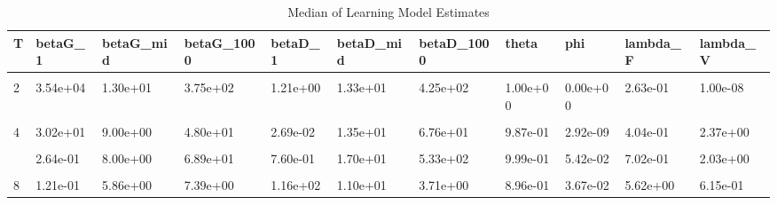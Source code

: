\begin{table}[!h]
\centering
\caption{Median of Learning Model Estimates}
\centering
\begin{tabular}[t]{lllllllllll}
\toprule
T & betaG\_1 & betaG\_mid & betaG\_1000 & betaD\_1 & betaD\_mid & betaD\_1000 & theta & phi & lambda\_F & lambda\_V\\
\midrule
\cellcolor{gray!10}{1} & \cellcolor{gray!10}{3.81e-04} & \cellcolor{gray!10}{1.58e+01} & \cellcolor{gray!10}{2.21e+02} & \cellcolor{gray!10}{7.19e-09} & \cellcolor{gray!10}{3.95e+01} & \cellcolor{gray!10}{6.58e+02} & \cellcolor{gray!10}{1.00e+00} & \cellcolor{gray!10}{8.88e-01} & \cellcolor{gray!10}{1.77e+01} & \cellcolor{gray!10}{6.18e+05}\\
2 & 3.54e+04 & 1.30e+01 & 3.75e+02 & 1.21e+00 & 1.33e+01 & 4.25e+02 & 1.00e+00 & 0.00e+00 & 2.63e-01 & 1.00e-08\\
\cellcolor{gray!10}{3} & \cellcolor{gray!10}{2.52e-02} & \cellcolor{gray!10}{8.82e+00} & \cellcolor{gray!10}{8.52e+01} & \cellcolor{gray!10}{2.11e-02} & \cellcolor{gray!10}{3.90e+01} & \cellcolor{gray!10}{6.98e+02} & \cellcolor{gray!10}{1.00e+00} & \cellcolor{gray!10}{7.72e-01} & \cellcolor{gray!10}{4.27e+00} & \cellcolor{gray!10}{4.69e+04}\\
4 & 3.02e+01 & 9.00e+00 & 4.80e+01 & 2.69e-02 & 1.35e+01 & 6.76e+01 & 9.87e-01 & 2.92e-09 & 4.04e-01 & 2.37e+00\\
\cellcolor{gray!10}{5} & \cellcolor{gray!10}{3.59e+00} & \cellcolor{gray!10}{7.00e+00} & \cellcolor{gray!10}{7.66e+00} & \cellcolor{gray!10}{1.44e-01} & \cellcolor{gray!10}{1.40e+01} & \cellcolor{gray!10}{3.95e+01} & \cellcolor{gray!10}{9.77e-01} & \cellcolor{gray!10}{3.05e-09} & \cellcolor{gray!10}{8.87e-01} & \cellcolor{gray!10}{4.73e-01}\\
\addlinespace
6 & 2.64e-01 & 8.00e+00 & 6.89e+01 & 7.60e-01 & 1.70e+01 & 5.33e+02 & 9.99e-01 & 5.42e-02 & 7.02e-01 & 2.03e+00\\
\cellcolor{gray!10}{7} & \cellcolor{gray!10}{1.40e+00} & \cellcolor{gray!10}{2.50e+00} & \cellcolor{gray!10}{3.21e+00} & \cellcolor{gray!10}{8.45e+01} & \cellcolor{gray!10}{1.02e+01} & \cellcolor{gray!10}{1.55e+00} & \cellcolor{gray!10}{7.72e-01} & \cellcolor{gray!10}{3.56e-03} & \cellcolor{gray!10}{4.52e+00} & \cellcolor{gray!10}{1.68e-02}\\
8 & 1.21e-01 & 5.86e+00 & 7.39e+00 & 1.16e+02 & 1.10e+01 & 3.71e+00 & 8.96e-01 & 3.67e-02 & 5.62e+00 & 6.15e-01\\
\bottomrule
\end{tabular}
\end{table}